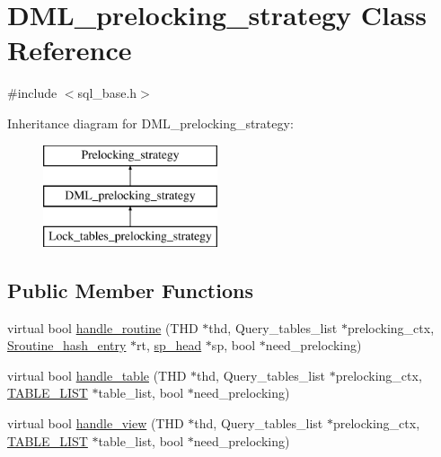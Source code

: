\hypertarget{classDML__prelocking__strategy}{}\section{D\+M\+L\+\_\+prelocking\+\_\+strategy Class Reference}
\label{classDML__prelocking__strategy}


{\ttfamily \#include $<$sql\+\_\+base.\+h$>$}

Inheritance diagram for D\+M\+L\+\_\+prelocking\+\_\+strategy\+:\begin{figure}[H]
\begin{center}
\leavevmode
\includegraphics[height=3.000000cm]{classDML__prelocking__strategy}
\end{center}
\end{figure}
\subsection*{Public Member Functions}
\begin{DoxyCompactItemize}
\item 
virtual bool \mbox{\hyperlink{group__Data__Dictionary_ga4d51adf9905616e57f7b572081f537ac}{handle\+\_\+routine}} (T\+HD $\ast$thd, Query\+\_\+tables\+\_\+list $\ast$prelocking\+\_\+ctx, \mbox{\hyperlink{classSroutine__hash__entry}{Sroutine\+\_\+hash\+\_\+entry}} $\ast$rt, \mbox{\hyperlink{classsp__head}{sp\+\_\+head}} $\ast$sp, bool $\ast$need\+\_\+prelocking)
\item 
virtual bool \mbox{\hyperlink{group__Data__Dictionary_gab4041a333019fb1a8ffb4e3772f627cf}{handle\+\_\+table}} (T\+HD $\ast$thd, Query\+\_\+tables\+\_\+list $\ast$prelocking\+\_\+ctx, \mbox{\hyperlink{structTABLE__LIST}{T\+A\+B\+L\+E\+\_\+\+L\+I\+ST}} $\ast$table\+\_\+list, bool $\ast$need\+\_\+prelocking)
\item 
virtual bool \mbox{\hyperlink{group__Data__Dictionary_ga757cc4c5e9baf4dfae041368257e46e4}{handle\+\_\+view}} (T\+HD $\ast$thd, Query\+\_\+tables\+\_\+list $\ast$prelocking\+\_\+ctx, \mbox{\hyperlink{structTABLE__LIST}{T\+A\+B\+L\+E\+\_\+\+L\+I\+ST}} $\ast$table\+\_\+list, bool $\ast$need\+\_\+prelocking)
\end{DoxyCompactItemize}


